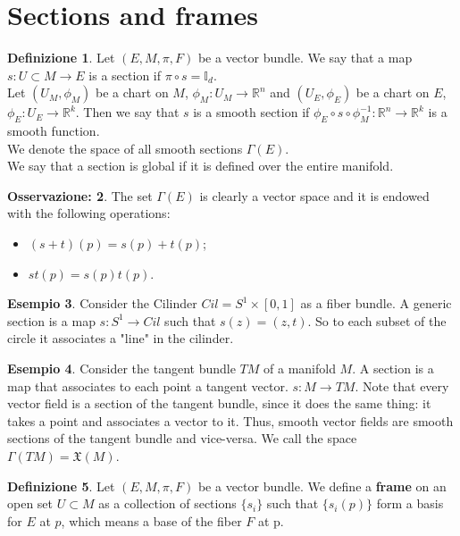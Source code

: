 \documentclass[12pt,a4paper]{report}
\theoremstyle{definition}
\newtheorem{Def}{Definizione}[chapter]
\theoremstyle{Theorem}
\theoremstyle{definition}
\newtheorem{Ex}[Def]{Esempio}
\theoremstyle{definition}
\theoremstyle{definition}
\newtheorem{Obs}[Def]{Osservazione:}
\begin{document}
	\section{Sections and frames}
	\begin{Def}\label{Def_5.5}
		Let $(E,M,\pi,F)$ be a vector bundle. We say that a map \\$s:U\subset M\rightarrow E$ is a section if $\pi\circ s=\mathbb{I}_d$. \\
		Let $(U_M,\phi_M)$ be a chart on $M$, $\phi_M:U_M\rightarrow \mathbb{R}^n$ and $(U_E,\phi_E)$ be a chart on $E$, $\phi_E:U_E\rightarrow \mathbb{R}^k$. Then we say that $s$ is a smooth section if $\phi_E\circ s\circ \phi^{-1}_M:\mathbb{R}^n\rightarrow \mathbb{R}^k$ is a smooth function.\\
		We denote the space of all smooth sections $\Gamma(E)$.
		\\
		We say that a section is global if it is defined over the entire manifold.
	\end{Def}
	\begin{Obs}\label{Obs_1.1}
		The set $\Gamma(E)$ is clearly a vector space and it is endowed with the following operations:
		\begin{itemize}
			\item $(s+t)(p)=s(p)+t(p)$;
			\item $st(p)=s(p)t(p)$.
		\end{itemize}
	\end{Obs}
	\begin{Ex}\label{Ex_5.4}
		Consider the Cilinder $Cil=S^1\times [0,1]$ as a fiber bundle. A generic section is a map $s:S^1\rightarrow Cil$ such that $s(z)=(z,t)$. So to each subset of the circle it associates a "line" in the cilinder.
	\end{Ex}
	\begin{Ex}
		Consider the tangent bundle $TM$ of a manifold $M$. A section is a map that associates to each point a tangent vector. $s:M\rightarrow TM$. Note that every vector field is a section of the tangent bundle, since it does the same thing: it takes a point and associates a vector to it. Thus, smooth vector fields are smooth sections of the tangent bundle and vice-versa. We call the space $\Gamma(TM)=\mathfrak{X}(M)$.
	\end{Ex}
	\begin{Def}\label{Def_5.6}
		Let $(E,M,\pi,F)$ be a vector bundle. We define a \textbf{frame} on an open set $U\subset M$ as a collection of sections $\{s_i\}$ such that $\{s_i(p)\}$ form a basis for $E$ at $p$, which means a base of the fiber $F$ at p. 
	\end{Def}
\end{document}
